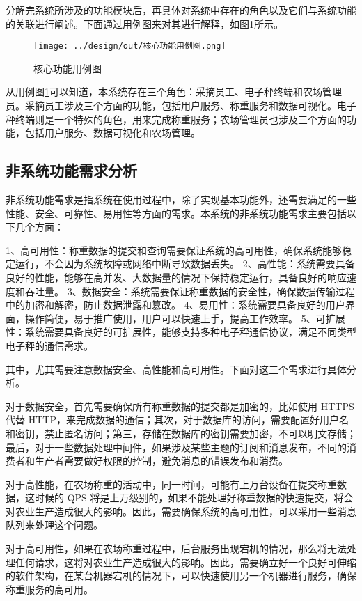分解完系统所涉及的功能模块后，再具体对系统中存在的角色以及它们与系统功能的关联进行阐述。下面通过用例图来对其进行解释，如图\ref{fig:核心功能用例图}所示。

\begin{figure}[H]
    \centering
    \texttt{[image: ../design/out/核心功能用例图.png]}
    \caption{核心功能用例图}
    \label{fig:核心功能用例图}
\end{figure}

从用例图\ref{fig:核心功能用例图}可以知道，本系统存在三个角色：采摘员工、电子秤终端和农场管理员。采摘员工涉及三个方面的功能，包括用户服务、称重服务和数据可视化。电子秤终端则是一个特殊的角色，用来完成称重服务；农场管理员也涉及三个方面的功能，包括用户服务、数据可视化和农场管理。

\subsection{非系统功能需求分析}

非系统功能需求是指系统在使用过程中，除了实现基本功能外，还需要满足的一些性能、安全、可靠性、易用性等方面的需求。本系统的非系统功能需求主要包括以下几个方面：

1、高可用性：称重数据的提交和查询需要保证系统的高可用性，确保系统能够稳定运行，不会因为系统故障或网络中断导致数据丢失。
2、高性能：系统需要具备良好的性能，能够在高并发、大数据量的情况下保持稳定运行，具备良好的响应速度和吞吐量。
3、数据安全：系统需要保证称重数据的安全性，确保数据传输过程中的加密和解密，防止数据泄露和篡改。
4、易用性：系统需要具备良好的用户界面，操作简便，易于推广使用，用户可以快速上手，提高工作效率。
5、可扩展性：系统需要具备良好的可扩展性，能够支持多种电子秤通信协议，满足不同类型电子秤的通信需求。

其中，尤其需要注意数据安全、高性能和高可用性。下面对这三个需求进行具体分析。

对于数据安全，首先需要确保所有称重数据的提交都是加密的，比如使用 HTTPS 代替 HTTP，来完成数据的通信；其次，对于数据库的访问，需要配置好用户名和密钥，禁止匿名访问；第三，存储在数据库的密钥需要加密，不可以明文存储；最后，对于一些数据处理中间件，如果涉及某些主题的订阅和消息发布，不同的消费者和生产者需要做好权限的控制，避免消息的错误发布和消费。

对于高性能，在农场称重的活动中，同一时间，可能有上万台设备在提交称重数据，这时候的 QPS 将是上万级别的，如果不能处理好称重数据的快速提交，将会对农业生产造成很大的影响。因此，需要确保系统的高可用性，可以采用一些消息队列来处理这个问题。

对于高可用性，如果在农场称重过程中，后台服务出现宕机的情况，那么将无法处理任何请求，这将对农业生产造成很大的影响。因此，需要确立好一个良好可伸缩的软件架构，在某台机器宕机的情况下，可以快速使用另一个机器进行服务，确保称重服务的高可用。

